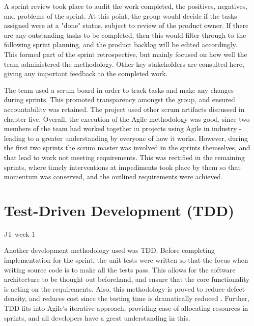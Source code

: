 A sprint review took place to audit the work completed, the positives, negatives, and problems of the sprint. At this point, the group would decide if the tasks assigned were at a "done" status, subject to review of the product owner. If there are any outstanding tasks to be completed, then this would filter through to the following sprint planning, and the product backlog will be edited accordingly. This formed part of the sprint retrospective, but mainly focused on how well the team administered the methodology. Other key stakeholders are consulted here, giving any important feedback to the completed work.

The team used a scrum board in order to track tasks and make any changes during sprints. This promoted transparency amongst the group, and ensured accountability was retained. The project used other scrum artifacts discussed in chapter five. Overall, the execution of the Agile methodology was good, since two members of the team had worked together in projects using Agile in industry - leading to a greater understanding by everyone of how it works. However, during the first two sprints the scrum master was involved in the sprints themselves, and that lead to work not meeting requirements. This was rectified in the remaining sprints, where timely interventions at impediments took place by them so that momentum was conserved, and the outlined requirements were achieved.



\section{Test-Driven Development (TDD)}
JT week 1

Another development methodology used was TDD. Before completing implementation for the sprint, the unit tests were written so that the focus when writing source code is to make all the tests pass. This allows for the software architecture to be thought out beforehand, and ensure that the core functionality is acting on the requirements. Also, this methodology is proved to reduce defect density, and reduces cost since the testing time is dramatically reduced \cite{bulajic}. Further, TDD fits into Agile's iterative approach, providing ease of allocating resources in sprints, and all developers have a great understanding in this.

